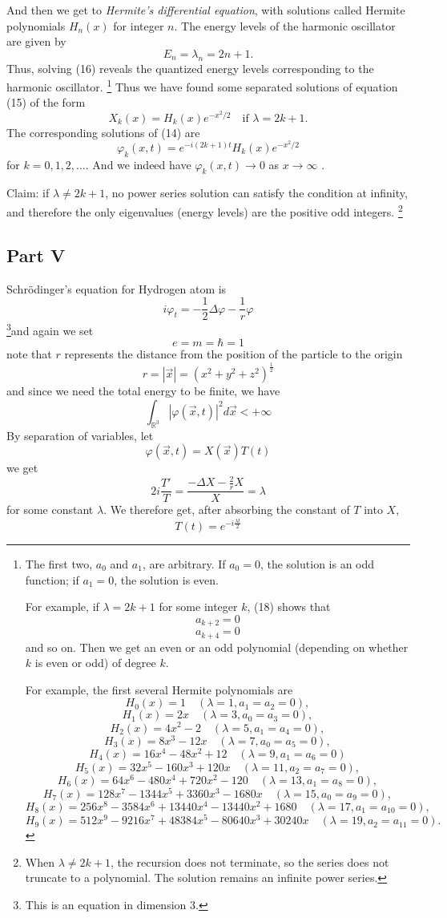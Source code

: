 \documentclass[a4paper,12pt]{report}
\begin{document}
And then we get to \textit{Hermite's differential equation}, with solutions called Hermite polynomials $H_n(x)$ for integer $n$. The energy levels of the harmonic oscillator are given by
\[
E_n = \lambda_n = 2n + 1.
\]
Thus, solving (16) reveals the quantized energy levels corresponding to the harmonic oscillator.
\footnote{The first two, $a_0$ and $a_1$, are arbitrary. If $a_0 = 0$, the solution is an odd function; if $a_1 = 0$, the solution is even.

For example, if $\lambda = 2k+1$ for some integer $k$, (18) shows that \[a_{k+2} = 0\]
\[a_{k+4} = 0\]
 and so on. Then we get an even or an odd polynomial (depending on whether $k$ is even or odd) of degree $k$. 
 
 For example, the first several Hermite polynomials are
\[H_0(x)  = 1 \quad (\lambda = 1, a_1 = a_2 = 0), \]
\[H_1(x)  = 2x \quad (\lambda = 3, a_0 = a_3 = 0), \]
\[H_2(x)  = 4x^2 - 2 \quad (\lambda = 5, a_1 = a_4 = 0), \]
\[H_3(x)  = 8x^3 - 12x \quad (\lambda = 7, a_0 = a_5 = 0), \]
\[H_4(x)  = 16x^4 - 48x^2 + 12 \quad (\lambda = 9, a_1 = a_6 = 0) \]
\[
H_5(x) = 32x^5 - 160x^3 + 120x \quad (\lambda = 11, a_2 = a_7 = 0),
\]
\[
H_6(x) = 64x^6 - 480x^4 + 720x^2 - 120 \quad (\lambda = 13, a_1 = a_8 = 0),
\]
\[
H_7(x) = 128x^7 - 1344x^5 + 3360x^3 - 1680x \quad (\lambda = 15, a_0 = a_9 = 0),
\]
\[
H_8(x) = 256x^8 - 3584x^6 + 13440x^4 - 13440x^2 + 1680 \quad (\lambda = 17, a_1 = a_{10} = 0),
\]
\[
H_9(x) = 512x^9 - 9216x^7 + 48384x^5 - 80640x^3 + 30240x \quad (\lambda = 19, a_2 = a_{11} = 0).
\]
}
Thus we have found some separated solutions of equation (15) of the form
\[
X_k(x) = H_k(x)e^{-x^2/2} \quad \text{if } \lambda = 2k+1.
\]
The corresponding solutions of (14) are
\[
\varphi_k(x, t) = e^{-i(2k+1)t}H_k(x)e^{-x^2/2}
\]
for $k = 0, 1, 2, \ldots$. And we indeed have $\varphi_k(x, t) \to 0$ as $x \to \infty$ . 

Claim: if $\lambda \neq 2k+1$, no power series solution can satisfy the condition at infinity, and therefore the only eigenvalues (energy levels) are the positive odd integers. 
\footnote{When \(\lambda \neq 2k+1\), the recursion does not terminate, so the series does not truncate to a polynomial. The solution remains an infinite power series.}
\subsection{Part V}
Schr\"odinger's equation for Hydrogen atom is 
\[i\varphi_t = -\frac{1}{2} \Delta \varphi - \frac{1}{r} \varphi\]
\footnote{This is an equation in dimension 3. }and again we set \[e = m = \hbar = 1\]
note that \(r\) represents the distance from the position of the particle to the origin \[r = |\vec{x}| = (x^2 + y^2 + z^2)^{\frac{1}{2}}\]
and since we need the total energy to be finite, we have 
\[\int_{\mathbb{R}^3} |\varphi(\vec{x}, t)|^2 d\vec{x} < +\infty\]
By separation of variables, let 
\[\varphi(\vec{x}, t) = X(\vec{x}) T(t)\]
we get 
\[2i \frac{T'}{T} = \frac{-\Delta X - \frac{2}{r}X}{X} = \lambda\]
for some constant \(\lambda\). We therefore get, after absorbing the constant of \(T\) into \(X\), \[T(t) = e^{-i\frac{\lambda t}{2}}\]
\end{document}
